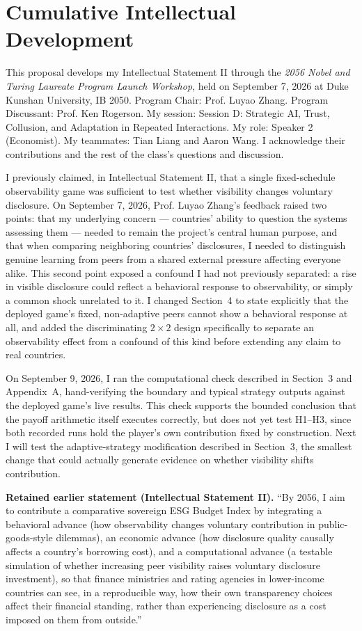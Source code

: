 \section{Cumulative Intellectual Development}
This proposal develops my Intellectual Statement II through the \emph{2056 Nobel and Turing Laureate Program Launch Workshop}, held on September 7, 2026 at Duke Kunshan University, IB 2050. Program Chair: Prof. Luyao Zhang. Program Discussant: Prof. Ken Rogerson. My session: Session D: Strategic AI, Trust, Collusion, and Adaptation in Repeated Interactions. My role: Speaker 2 (Economist). My teammates: Tian Liang and Aaron Wang. I acknowledge their contributions and the rest of the class's questions and discussion.

I previously claimed, in Intellectual Statement II, that a single fixed-schedule observability game was sufficient to test whether visibility changes voluntary disclosure. On September 7, 2026, Prof. Luyao Zhang's feedback raised two points: that my underlying concern --- countries' ability to question the systems assessing them --- needed to remain the project's central human purpose, and that when comparing neighboring countries' disclosures, I needed to distinguish genuine learning from peers from a shared external pressure affecting everyone alike. This second point exposed a confound I had not previously separated: a rise in visible disclosure could reflect a behavioral response to observability, or simply a common shock unrelated to it. I changed Section~4 to state explicitly that the deployed game's fixed, non-adaptive peers cannot show a behavioral response at all, and added the discriminating $2\times2$ design specifically to separate an observability effect from a confound of this kind before extending any claim to real countries.

On September 9, 2026, I ran the computational check described in Section~3 and Appendix~A, hand-verifying the boundary and typical strategy outputs against the deployed game's live results. This check supports the bounded conclusion that the payoff arithmetic itself executes correctly, but does not yet test H1--H3, since both recorded runs hold the player's own contribution fixed by construction. Next I will test the adaptive-strategy modification described in Section~3, the smallest change that could actually generate evidence on whether visibility shifts contribution.

\textbf{Retained earlier statement (Intellectual Statement II).} ``By 2056, I aim to contribute a comparative sovereign ESG Budget Index by integrating a behavioral advance (how observability changes voluntary contribution in public-goods-style dilemmas), an economic advance (how disclosure quality causally affects a country's borrowing cost), and a computational advance (a testable simulation of whether increasing peer visibility raises voluntary disclosure investment), so that finance ministries and rating agencies in lower-income countries can see, in a reproducible way, how their own transparency choices affect their financial standing, rather than experiencing disclosure as a cost imposed on them from outside.''

